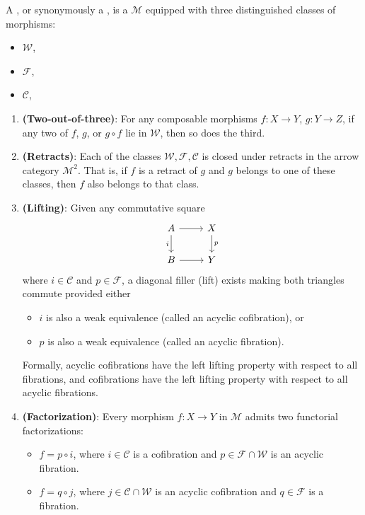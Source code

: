 \begin{definition} \label{definition:model_category}
A , or synonymously a , is a  $\mathcal{M}$ equipped with three distinguished classes of morphisms:

\begin{itemize}
  \item {} $\mathcal{W}$,
  \item {} $\mathcal{F}$,
  \item {} $\mathcal{C}$,
\end{itemize}

\begin{enumerate}
  \item \textbf{(Two-out-of-three)}: For any composable morphisms $f: X \to Y$, $g: Y \to Z$, if any two of $f$, $g$, or $g \circ f$ lie in $\mathcal{W}$, then so does the third.

  \item \textbf{(Retracts)}: Each of the classes $\mathcal{W}, \mathcal{F}, \mathcal{C}$ is closed under retracts in the arrow category $\mathcal{M}^2$. That is, if $f$ is a retract of $g$ and $g$ belongs to one of these classes, then $f$ also belongs to that class.

  \item \textbf{(Lifting)}: Given any commutative square
  $$  \begin{tikzcd}
  A \arrow[r] \arrow[d, "i"'] & X \arrow[d, "p"] \\
  B \arrow[r] & Y
  \end{tikzcd}
  $$
  where $i \in \mathcal{C}$ and $p \in \mathcal{F}$, a diagonal filler (lift) exists making both triangles commute provided either
  \begin{itemize}
    \item $i$ is also a weak equivalence (called an acyclic cofibration), or
    \item $p$ is also a weak equivalence (called an acyclic fibration).
  \end{itemize}

  Formally, acyclic cofibrations have the left lifting property with respect to all fibrations, and cofibrations have the left lifting property with respect to all acyclic fibrations.

  \item \textbf{(Factorization)}: Every morphism $f : X \to Y$ in $\mathcal{M}$ admits two functorial factorizations:
  \begin{itemize}
    \item $f = p \circ i$, where $i \in \mathcal{C}$ is a cofibration and $p \in \mathcal{F} \cap \mathcal{W}$ is an acyclic fibration.
    \item $f = q \circ j$, where $j \in \mathcal{C} \cap \mathcal{W}$ is an acyclic cofibration and $q \in \mathcal{F}$ is a fibration.
  \end{itemize}
  

\end{enumerate}
\end{definition}
